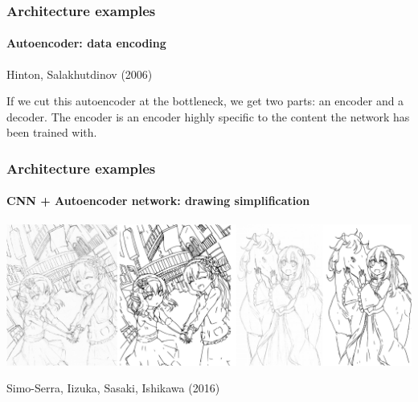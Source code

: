 \documentclass[9pt]{beamer}
\begin{document}
\begin{frame}
  \frametitle{Architecture examples}

  \framesubtitle{Autoencoder: data encoding}

  \begin{center}
  \end{center}

  Hinton, Salakhutdinov (2006)

  \pause

  \bigskip

  If we cut this autoencoder at the bottleneck, we get two parts: an
  encoder and a decoder. The encoder is an encoder highly specific to
  the content the network has been trained with.
\end{frame}

\begin{frame}
  \frametitle{Architecture examples}

  \framesubtitle{CNN + Autoencoder network: drawing simplification}

  \begin{center}
    \includegraphics[width = \linewidth]{images/drawing_simplification_example.png}
  \end{center}

  Simo-Serra, Iizuka, Sasaki, Ishikawa (2016)
\end{frame}
\end{document}
